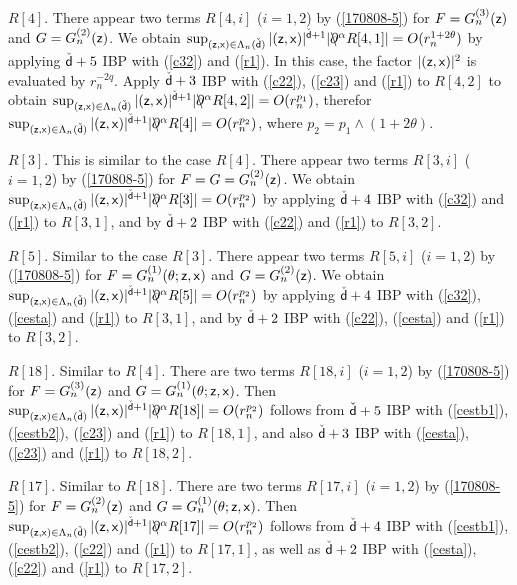 \documentclass[a4paper]{article}
\numberwithin{equation}{section}
\def\csfd{{\check{\sfd}}}
\newcommand{\sfx}{{\sf x}}
\newcommand{\sfz}{{\sf z}}
\def\sfd{{\sf d}}
\def\partialbs{\backslash\!\!\!\partial}
\begin{document}
{\im $R[4]$. %
There appear two terms $R[4,i]$ ($i=1,2$) by (\ref{170808-5}) 
for $F=G^{(3)}_n(\sfz)$ and $G=G^{(2)}_n(\sfz)$. 
We obtain 
 $\sup_{(\sfz,\sfx)\in\Lambda_n(\csfd)}|(\sfz,\sfx)|^{\csfd+1}|\partialbs^\alpha R[4,1]|=O(r_n^{1+2\theta})$ 
 by applying $\csfd+5$ IBP with (\ref{c32}) and (\ref{r1}). 
 In this case, the factor $|(\sfz,\sfx)|^2$ is evaluated by $r_n^{-2q}$. 
Apply $\csfd+3$ IBP with (\ref{c22}), (\ref{c23}) and (\ref{r1}) to $R[4,2]$ to obtain 
$\sup_{(\sfz,\sfx)\in\Lambda_n(\csfd)}|(\sfz,\sfx)|^{\csfd+1}|\partialbs^\alpha R[4,2]|=O(r_n^{p_1})$, therefor 
$\sup_{(\sfz,\sfx)\in\Lambda_n(\csfd)}|(\sfz,\sfx)|^{\csfd+1}|\partialbs^\alpha R[4]|=O(r_n^{p_2})$, 
where $p_2=p_1\wedge(1+2\theta)$. 

\im $R[3]$. This is similar to the case $R[4]$. 
There appear two terms $R[3,i]$ ($i=1,2$) by (\ref{170808-5}) 
for $F=G=G^{(2)}_n(\sfz)$. 
We obtain 
$\sup_{(\sfz,\sfx)\in\Lambda_n(\csfd)}|(\sfz,\sfx)|^{\csfd+1}|\partialbs^\alpha R[3]|=O(r_n^{p_2})$ 
by applying $\csfd+4$ IBP with (\ref{c32}) and (\ref{r1}) to $R[3,1]$, and 
by $\csfd+2$ IBP with (\ref{c22}) and (\ref{r1}) to $R[3,2]$. 

\im $R[5]$. Similar to the case $R[3]$. 
There appear two terms $R[5,i]$ ($i=1,2$) by (\ref{170808-5}) 
for $F=G^{(1)}_n(\theta;\sfz,\sfx)$ and $G=G^{(2)}_n(\sfz)$. 
We obtain 
$\sup_{(\sfz,\sfx)\in\Lambda_n(\csfd)}|(\sfz,\sfx)|^{\csfd+1}|\partialbs^\alpha R[5]|=O(r_n^{p_2})$ 
by applying $\csfd+4$ IBP with (\ref{c32}), (\ref{cesta}) and (\ref{r1}) to $R[3,1]$, and 
by $\csfd+2$ IBP with (\ref{c22}), (\ref{cesta}) and (\ref{r1}) to $R[3,2]$. 

\im $R[18]$. Similar to $R[4]$. 
There are two terms $R[18,i]$ ($i=1,2$) by (\ref{170808-5}) 
for $F=G^{(3)}_n(\sfz)$ and $G=G^{(1)}_n(\theta;\sfz,\sfx)$. 
Then 
$\sup_{(\sfz,\sfx)\in\Lambda_n(\csfd)}|(\sfz,\sfx)|^{\csfd+1}|\partialbs^\alpha R[18]|=O(r_n^{p_2})$ follows from 
$\csfd+5$ IBP with (\ref{cestb1}), (\ref{cestb2}), (\ref{c23}) and (\ref{r1}) to $R[18,1]$, and also 
$\csfd+3$ IBP with (\ref{cesta}), (\ref{c23}) and (\ref{r1}) to $R[18,2]$. 

\im $R[17]$. Similar to $R[18]$. 
There are two terms $R[17,i]$ ($i=1,2$) by (\ref{170808-5}) 
for $F=G^{(2)}_n(\sfz)$ and $G=G^{(1)}_n(\theta;\sfz,\sfx)$. 
Then 
$\sup_{(\sfz,\sfx)\in\Lambda_n(\csfd)}|(\sfz,\sfx)|^{\csfd+1}|\partialbs^\alpha R[17]|=O(r_n^{p_2})$ follows from 
$\csfd+4$ IBP with (\ref{cestb1}), (\ref{cestb2}), (\ref{c22}) and (\ref{r1}) to $R[17,1]$, as well as  
$\csfd+2$ IBP with (\ref{cesta}), (\ref{c22}) and (\ref{r1}) to $R[17,2]$. 

}
\end{document}
